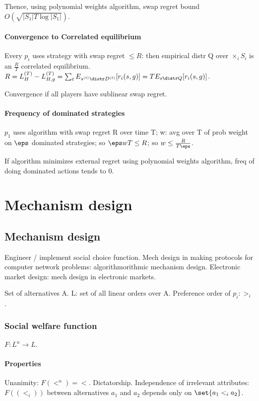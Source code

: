 \documentclass[oneside, article]{memoir}
\begin{document}
Thence, using polynomial weights algorithm, swap regret bound\\ $O(\sqrt{|S_{1}| T \log |S_{1}|})$.

\subsubsection{Convergence to Correlated equilibrium}
Every $p_{i}$ uses strategy with swap regret $\leq R$: then empirical distr Q over $\times_{i} S_{i}$ is an $\frac{R}{T}$ correlated equilibrium. $R = L_{H}^{(T)} - L_{H,g}^{(T)} = \sum_{t} E_{s^{(t)} \distr D^{(t)}}[r_{i}(s,g)] = T E_{s \distr Q}[r_{i}(s,g)]$.

Convergence if all players have sublinear swap regret.

\subsubsection{Frequency of dominated strategies}
$p_{1}$ uses algorithm with swap regret R over time T; w: avg over T of prob weight on $\eps$ dominated strategies; so $\eps wT \leq R$; so $w \leq \frac{R}{T\eps}$.

If algorithm minimizes external regret using polynomial weights algorithm, freq of doing dominated actions tends to 0.

\chapter{Mechanism design}
\section{Mechanism design}
Engineer / implement social choice function. Mech design in making protocols for computer network problems: algorithmorithmic mechanism design. Electronic market design: mech design in electronic markets.

Set of alternatives A. L: set of all linear orders over A. Preference order of $p_{i}: >_{i}$.

\subsection{Social welfare function}
$F:L^{n} \to L$.

\subsubsection{Properties}
Unanimity: $F(<^{n}) = <$. Dictatorship. Independence of irrelevant attributes: $F((<_{i}))$ between alternatives $a_{1}$ and $a_{2}$ depends only on $\set{a_{1}<_{i} a_{2}}$.
\end{document}
